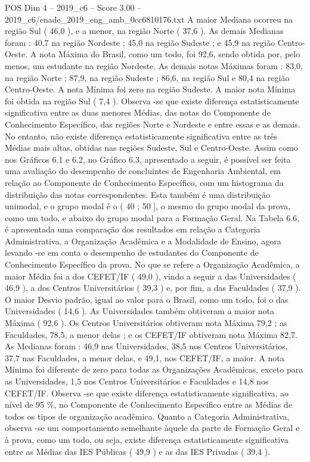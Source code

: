 \begin{textsample}{POS Dim 4 – 2019\_c6 – Score 3.00 – 2019\_c6/enade\_2019\_eng\_amb\_0cc6810176.txt}
A maior Mediana ocorreu na região Sul ( 46,0 ), e a menor, na região Norte ( 37,6 ).
As demais Medianas foram : 40,7 na região Nordeste ; 45,0 na região Sudeste ; e 45,9 na região Centro-Oeste.
A nota Máxima do Brasil, como um todo, foi 92,6, sendo obtida por, pelo menos, um estudante na região Nordeste.
As demais notas Máximas foram : 83,0, na região Norte ; 87,9, na região Sudeste ; 86,6, na região Sul e 80,4 na região Centro-Oeste.
A nota Mínima foi zero na região Sudeste.
A maior nota Mínima foi obtida na região Sul ( 7,4 ).
Observa -se que existe diferença estatisticamente significativa entre as duas menores Médias, das notas do Componente de Conhecimento Específico, das regiões Norte e Nordeste e entre essas e as demais.
No entanto, não existe diferença estatisticamente significativa entre as três Médias mais altas, obtidas nas regiões Sudeste, Sul e Centro-Oeste.
Assim como nos Gráficos 6.1 e 6.2, no Gráfico 6.3, apresentado a seguir, é possível ser feita uma avaliação do desempenho de concluintes de Engenharia Ambiental, em relação ao Componente de Conhecimento Específico, com um histograma da distribuição das notas correspondentes.
Esta também é uma distribuição unimodal, e o grupo modal é o ( 40 ; 50 ], o mesmo do grupo modal da prova, como um todo, e abaixo do grupo modal para a Formação Geral.
Na Tabela 6.6, é apresentada uma comparação dos resultados em relação a Categoria Administrativa, a Organização Acadêmica e a Modalidade de Ensino, agora levando -se em conta o desempenho de estudantes do Componente de Conhecimento Específico da prova.
No que se refere a Organização Acadêmica, a maior Média foi a dos CEFET/IF ( 49,0 ), vindo a seguir a das Universidades ( 46,9 ), a dos Centros Universitários ( 39,3 ) e, por fim, a das Faculdades ( 37,9 ).
O maior Desvio padrão, igual ao valor para o Brasil, como um todo, foi o das Universidades ( 14,6 ).
As Universidades também obtiveram a maior nota Máxima ( 92,6 ).
Os Centros Universitários obtiveram nota Máxima 79,2 ; as Faculdades, 78,5, a menor delas ; e os CEFET/IF obtiveram nota Máxima 82,7.
As Medianas foram : 46,9 nas Universidades, 38,5 nos Centros Universitários, 37,7 nas Faculdades, a menor delas, e 49,1, nos CEFET/IF, a maior.
A nota Mínima foi diferente de zero para todas as Organizações Acadêmicas, exceto para as Universidades, 1,5 nos Centros Universitários e Faculdades e 14,8 nos CEFET/IF.
Observa -se que existe diferença estatisticamente significativa, ao nível de 95 \%, no Componente de Conhecimento Específico entre as Médias de todos os tipos de organização acadêmica.
Quanto a Categoria Administrativa, observa -se um comportamento semelhante àquele da parte de Formação Geral e à prova, como um todo, ou seja, existe diferença estatisticamente significativa entre as Médias das IES Públicas ( 49,9 ) e as das IES Privadas ( 39,4 ).

\end{textsample}
